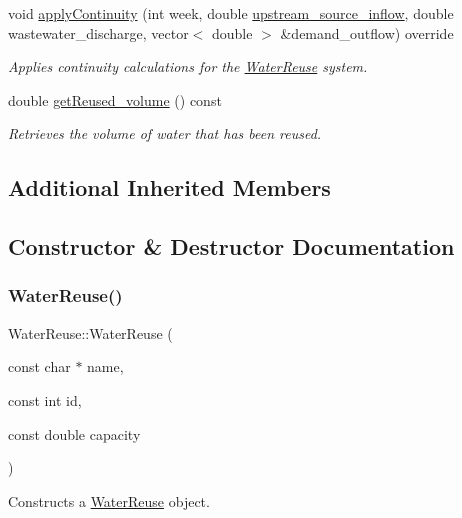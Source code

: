 \begin{DoxyCompactItemize}
void \mbox{\hyperlink{classWaterReuse_ab8ffb10c69790047a3a5dda66cfaf3ee}{apply\+Continuity}} (int week, double \mbox{\hyperlink{classWaterSource_a7a69b2e9b6030f1035e6cf44d2918ee5}{upstream\+\_\+source\+\_\+inflow}}, double wastewater\+\_\+discharge, vector$<$ double $>$ \&demand\+\_\+outflow) override
\begin{DoxyCompactList}\small\item\em Applies continuity calculations for the \mbox{\hyperlink{classWaterReuse}{Water\+Reuse}} system. \end{DoxyCompactList}\item 
double \mbox{\hyperlink{classWaterReuse_a78c905f77ca46fbbb2251f9cfa9a04de}{get\+Reused\+\_\+volume}} () const
\begin{DoxyCompactList}\small\item\em Retrieves the volume of water that has been reused. \end{DoxyCompactList}\end{DoxyCompactItemize}
\subsection*{Additional Inherited Members}


\subsection{Constructor \& Destructor Documentation}
\mbox{\label{classWaterReuse_a0493da65856f50fad2bc2d2c087f378f}} 
\subsubsection{\texorpdfstring{Water\+Reuse()}{WaterReuse()}\hspace{0.1cm}{\footnotesize\ttfamily [1/3]}}
{\footnotesize\ttfamily Water\+Reuse\+::\+Water\+Reuse (\begin{DoxyParamCaption}\item[{const char $\ast$}]{name,  }\item[{const int}]{id,  }\item[{const double}]{capacity }\end{DoxyParamCaption})}



Constructs a \mbox{\hyperlink{classWaterReuse}{Water\+Reuse}} object. 

